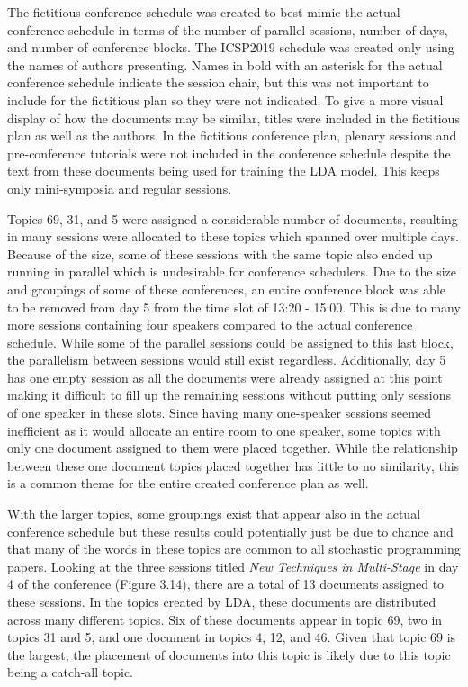\documentclass[a4paper, 12pt, twoside]{article}
\numberwithin{equation}{section} %
\begin{document}
The fictitious conference schedule was created to best mimic the actual conference schedule in terms of the number of parallel sessions, number of days, and number of conference blocks. The ICSP2019 schedule was created only using the names of authors presenting. Names in bold with an asterisk for the actual conference schedule indicate the session chair, but this was not important to include for the fictitious plan so they were not indicated. To give a more visual display of how the documents may be similar, titles were included in the fictitious plan as well as the authors. In the fictitious conference plan, plenary sessions and pre-conference tutorials were not included in the conference schedule despite the text from these documents being used for training the LDA model. This keeps only mini-symposia and regular sessions.

Topics 69, 31, and 5 were assigned a considerable number of documents, resulting in many sessions were allocated to these topics which spanned over multiple days. Because of the size, some of these sessions with the same topic also ended up running in parallel which is undesirable for conference schedulers. Due to the size and groupings of some of these conferences, an entire conference block was able to be removed from day 5 from the time slot of 13:20 - 15:00. This is due to many more sessions containing four speakers compared to the actual conference schedule. While some of the parallel sessions could be assigned to this last block, the parallelism between sessions would still exist regardless. Additionally, day 5 has one empty session as all the documents were already assigned at this point making it difficult to fill up the remaining sessions without putting only sessions of one speaker in these slots. Since having many one-speaker sessions seemed inefficient as it would allocate an entire room to one speaker, some topics with only one document assigned to them were placed together. While the relationship between these one document topics placed together has little to no similarity, this is a common theme for the entire created conference plan as well.

With the larger topics, some groupings exist that appear also in the actual conference schedule but these results could potentially just be due to chance and that many of the words in these topics are common to all stochastic programming papers. Looking at the three sessions titled \textit{New Techniques in Multi-Stage} in day 4 of the conference (Figure 3.14), there are a total of 13 documents assigned to these sessions. In the topics created by LDA, these documents are distributed across many different topics. Six of these documents appear in topic 69, two in topics 31 and 5, and one document in topics 4, 12, and 46. Given that topic 69 is the largest, the placement of documents into this topic is likely due to this topic being a catch-all topic.
\end{document}
